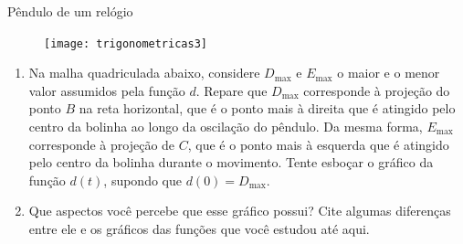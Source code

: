 \begin{task}{Pêndulo de um relógio}
\begin{figure}[H]
\texttt{[image: trigonometricas3]}
\end{figure}

\begin{enumerate}
\item Na malha quadriculada abaixo, considere $D_{\max}$ e $E_{\max}$ o maior e o menor valor assumidos pela função $d$. Repare que $D_{\max}$ corresponde à projeção do ponto $B$ na reta horizontal, que é o ponto mais à direita que é atingido pelo centro da bolinha ao longo da oscilação do pêndulo. Da mesma forma, $E_{\max}$ corresponde à projeção de $C$, que é o ponto mais à esquerda que é atingido pelo centro da bolinha durante o movimento. Tente esboçar o gráfico da função $d(t)$, supondo que $d(0) = D_{\max}$.

\begin{figure}[H]
\centering

\resizebox{.75\linewidth}{!}
{
}
\end{figure}

\item Que aspectos você percebe que esse gráfico possui? Cite algumas diferenças entre ele e os gráficos das funções que você estudou até aqui.
\end{enumerate}
\end{task}

